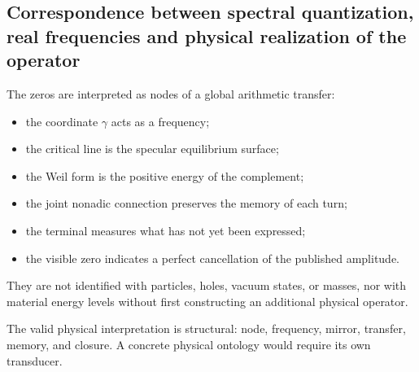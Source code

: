 \subsection{Correspondence between spectral quantization, real frequencies and physical realization of the operator}
The zeros are interpreted as nodes of a global arithmetic transfer:\par
\begin{itemize}
\item the coordinate \(\gamma\) acts as a frequency;
\item the critical line is the specular equilibrium surface;
\item the Weil form is the positive energy of the complement;
\item the joint nonadic connection preserves the memory of each turn;
\item the terminal measures what has not yet been expressed;
\item the visible zero indicates a perfect cancellation of the
published amplitude.
\end{itemize}
They are not identified with particles, holes, vacuum states, or masses, nor with material energy levels without first constructing an additional physical operator.\par
The valid physical interpretation is structural: node, frequency, mirror, transfer, memory, and closure. A concrete physical ontology would require its own transducer.\par
{}
